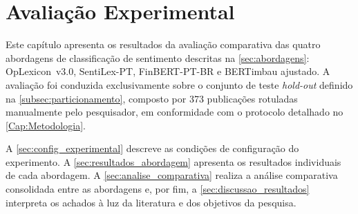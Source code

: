 \chapter{Avaliação Experimental} \label{Cap:Ava_Exp}

Este capítulo apresenta os resultados da avaliação comparativa das quatro abordagens de classificação de sentimento descritas na \autoref{sec:abordagens}: OpLexicon~v3.0, SentiLex-PT, FinBERT-PT-BR e BERTimbau ajustado. A avaliação foi conduzida exclusivamente sobre o conjunto de teste \textit{hold-out} definido na \autoref{subsec:particionamento}, composto por 373 publicações rotuladas manualmente pelo pesquisador, em conformidade com o protocolo detalhado no \autoref{Cap:Metodologia}.

A \autoref{sec:config_experimental} descreve as condições de configuração do experimento. A \autoref{sec:resultados_abordagem} apresenta os resultados individuais de cada abordagem. A \autoref{sec:analise_comparativa} realiza a análise comparativa consolidada entre as abordagens e, por fim, a \autoref{sec:discussao_resultados} interpreta os achados à luz da literatura e dos objetivos da pesquisa.




